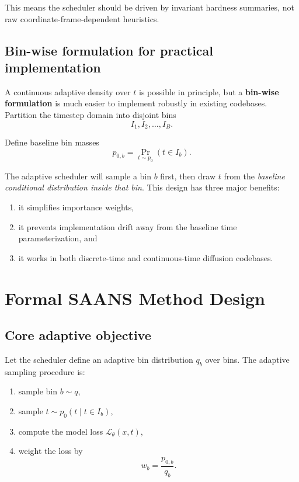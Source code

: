 \documentclass[11pt]{report}
\newcommand{\pbase}{p_0}
\newcommand{\loss}{\mathcal{L}}
\begin{document}
This means the scheduler should be driven by invariant hardness summaries, not raw coordinate-frame-dependent heuristics.

\section{Bin-wise formulation for practical implementation}

A continuous adaptive density over $t$ is possible in principle, but a \textbf{bin-wise formulation} is much easier to implement robustly in existing codebases. Partition the timestep domain into disjoint bins
\[
I_1, I_2, \dots, I_B.
\]

Define baseline bin masses
\[
p_{0,b} = \Pr_{t \sim \pbase}(t \in I_b).
\]

The adaptive scheduler will sample a bin $b$ first, then draw $t$ from the \emph{baseline conditional distribution inside that bin}. This design has three major benefits:

\begin{enumerate}[leftmargin=2em]
    \item it simplifies importance weights,
    \item it prevents implementation drift away from the baseline time parameterization, and
    \item it works in both discrete-time and continuous-time diffusion codebases.
\end{enumerate}

\chapter{Formal SAANS Method Design}

\section{Core adaptive objective}

Let the scheduler define an adaptive bin distribution $q_b$ over bins. The adaptive sampling procedure is:

\begin{enumerate}[leftmargin=2em]
    \item sample bin $b \sim q$,
    \item sample $t \sim \pbase(t \mid t \in I_b)$,
    \item compute the model loss $\loss_\theta(x,t)$,
    \item weight the loss by
    \[
    w_b = \frac{p_{0,b}}{q_b}.
    \]
\end{enumerate}
\end{document}
